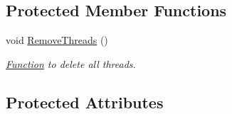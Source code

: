 \subsection*{Protected Member Functions}
\begin{DoxyCompactItemize}
\item 
void \hyperlink{class_thread_handler_ad4d317f59cbf8fb69cb22efb3199928a}{Remove\-Threads} ()
\begin{DoxyCompactList}\small\item\em \hyperlink{class_function}{Function} to delete all threads. \end{DoxyCompactList}\end{DoxyCompactItemize}
\subsection*{Protected Attributes}
